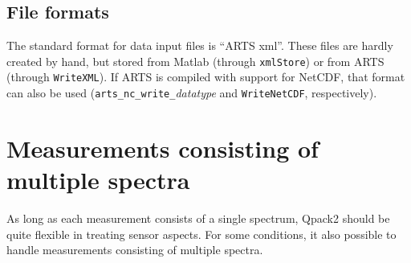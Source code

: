 \documentclass[a4paper,11pt]{article}
\begin{document}
\subsection{File formats}
%
The standard format for data input files is ``ARTS xml''. These files are
hardly created by hand, but stored from Matlab (through \verb|xmlStore|) or
from ARTS (through \verb|WriteXML|). If ARTS is compiled with support for
NetCDF, that format can also be used (\verb|arts_nc_write_|{\it datatype} and
\verb|WriteNetCDF|, respectively).



\section{Measurements consisting of multiple spectra}
\label{sec:scanning}
%
As long as each measurement consists of a single spectrum, Qpack2 should be
quite flexible in treating sensor aspects. For some conditions, it also
possible to handle measurements consisting of multiple spectra. 
\end{document}
